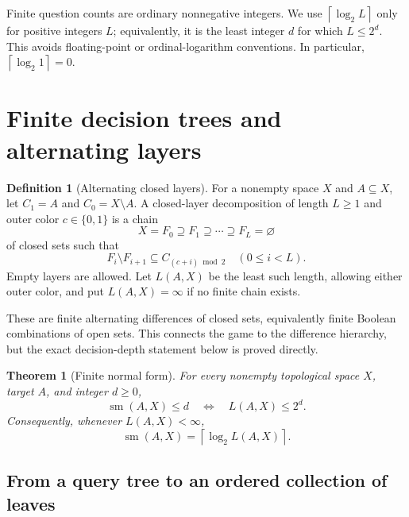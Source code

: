 \documentclass[11pt,letterpaper]{article}
\numberwithin{equation}{section}
\newtheorem{theorem}{Theorem}[section]
\theoremstyle{definition}
\newtheorem{definition}[definition]{Definition}
\theoremstyle{remark}
\newcommand{\sm}{\operatorname{sm}}
\newcommand{\ceil}[1]{\left\lceil#1\right\rceil}
\begin{document}
Finite question counts are ordinary nonnegative integers. We use
$\ceil{\log_2 L}$ only for positive integers $L$; equivalently, it is the least
integer $d$ for which $L\leq2^d$. This avoids floating-point or ordinal-logarithm
conventions. In particular, $\ceil{\log_2 1}=0$.

\section{Finite decision trees and alternating layers}\label{sec:normal}

\begin{definition}[Alternating closed layers]
For a nonempty space $X$ and $A\subseteq X$, let $C_1=A$ and
$C_0=X\setminus A$. A closed-layer decomposition of length $L\geq1$ and
outer color $c\in\{0,1\}$ is a chain
\begin{equation}\label{eq:layerchain}
 X=F_0\supseteq F_1\supseteq\cdots\supseteq F_L=\varnothing
\end{equation}
of closed sets such that
\begin{equation}\label{eq:layercolor}
 F_i\setminus F_{i+1}\subseteq C_{(c+i)\bmod2}
 \quad(0\leq i<L).
\end{equation}
Empty layers are allowed. Let $L(A,X)$ be the least such length, allowing either
outer color, and put $L(A,X)=\infty$ if no finite chain exists.
\end{definition}

These are finite alternating differences of closed sets, equivalently finite
Boolean combinations of open sets. This connects the game to the difference
hierarchy, but the exact decision-depth statement below is proved directly.

\begin{theorem}[Finite normal form]\label{thm:normal}
For every nonempty topological space $X$, target $A$, and integer $d\geq0$,
\begin{equation}\label{eq:normal}
 \sm(A,X)\leq d
 \quad\Longleftrightarrow\quad L(A,X)\leq2^d.
\end{equation}
Consequently, whenever $L(A,X)<\infty$,
\begin{equation}\label{eq:logdepth}
 \sm(A,X)=\ceil{\log_2 L(A,X)}.
\end{equation}
\end{theorem}

\subsection{From a query tree to an ordered collection of leaves}
\end{document}
